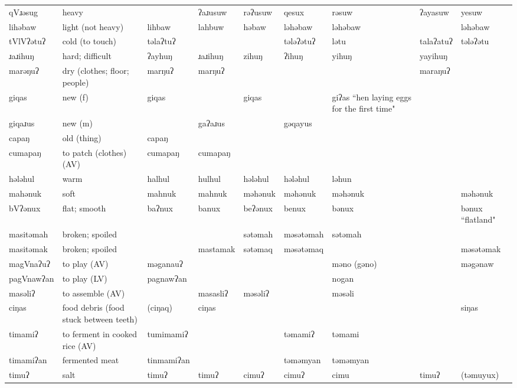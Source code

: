 \begin{landscape}
\begin{longtable}{*{9}{>{\raggedright\arraybackslash}p{}}}
\text{*}qVɹəsug & heavy &  & ʔaɹusuw & rəʔusuw & qesux & rəsuw & ʔayasuw & yesuw\\
\text{*}lihəbaw & light (not heavy) & lihbaw & lahbuw & həbaw & ləhəbaw & ləhəbaw &  & ləhəbaw\\
\text{*}tVlVʔətuʔ & cold (to touch) & təlaʔtuʔ &  &  & tələʔətuʔ & lətu & talaʔatuʔ & tələʔətu\\
\text{*}ɹaɹihuŋ & hard; difficult & ʔayhuŋ & ɹaɹihuŋ & zihuŋ & ʔihuŋ & yihuŋ & yayihuŋ & \\
\text{*}marəŋuʔ & dry (clothes; floor; people) & marŋuʔ & marŋuʔ &  &  &  & maraŋuʔ & \\
\text{*}giqas & new (f) & giqas &  & giqas &  & giʔas ``hen laying eggs for the first time" &  & \\
\text{*}giqaɹus & new (m) &  & gaʔaɹus &  & gəqayus &  &  & \\
\text{*}capaŋ & old (thing) & capaŋ &  &  &  &  &  & \\
\text{*}cumapaŋ & to patch (clothes) (AV) & cumapaŋ & cumapaŋ &  &  &  &  & \\
\text{*}hələhul & warm & halhul & hulhul & hələhul & hələhul & ləhun &  & \\
\text{*}mahənuk & soft & mahnuk & mahnuk & məhənuk & məhənuk & məhənuk &  & məhənuk\\
\text{*}bVʔənux & flat; smooth & baʔnux & banux & beʔənux & benux & bənux &  & bənux \newline ``flatland"\\
\text{*}masitəmah & broken; spoiled &  &  & sətəmah & məsətəmah & sətəmah &  & \\
\text{*}masitəmak & broken; spoiled &  & mastamak & sətəmaq & məsətəmaq &  &  & məsətəmak\\
\text{*}magVnaʔuʔ & to play (AV) & məganauʔ &  &  &  & məno (gəno) &  & məgənaw\\
\text{*}pagVnawʔan & to play (LV) & pagnawʔan &  &  &  & nogan &  & \\
\text{*}masəliʔ & to assemble (AV) &  & masasliʔ & məsəliʔ &  & məsəli &  & \\
\text{*}ciŋas & food debris (food stuck between teeth) & (ciŋaq) & ciŋas &  &  &  &  & siŋas\\
\text{*}timamiʔ & to ferment in cooked rice (AV) & tumimamiʔ &  &  & təmamiʔ & təmami &  & \\
\text{*}timamiʔan & fermented meat & tinmamiʔan &  &  & təməmyan & təməmyan &  & \\
\text{*}timuʔ & salt & timuʔ & timuʔ & cimuʔ & cimuʔ & cimu & timuʔ & (təmuyux)\\

\end{longtable}
\end{landscape}
